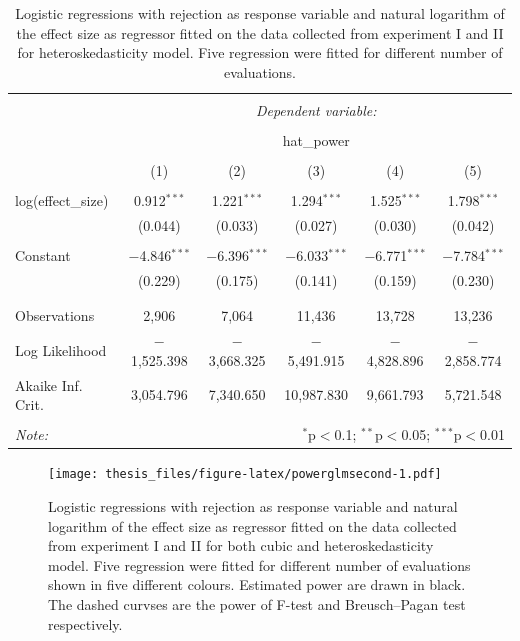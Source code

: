 \documentclass{monashthesis}
\theoremstyle{definition}
\theoremstyle{definition}
\theoremstyle{definition}
\theoremstyle{definition}
\theoremstyle{remark}
\begin{document}
\begin{table}[!htbp] \centering 
  \caption{Logistic regressions with rejection as response variable and natural logarithm of the effect size as regressor fitted on the data collected from experiment I and II for heteroskedasticity model. Five regression were fitted for different number of evaluations.} 
  \label{tab:powerglmhetersecond} 
\begin{tabular}{@{\extracolsep{5pt}}lccccc} 
\\[-1.8ex]\hline 
\hline \\[-1.8ex] 
 & \multicolumn{5}{c}{\textit{Dependent variable:}} \\ 
\cline{2-6} 
\\[-1.8ex] & \multicolumn{5}{c}{hat\_power} \\ 
\\[-1.8ex] & (1) & (2) & (3) & (4) & (5)\\ 
\hline \\[-1.8ex] 
 log(effect\_size) & 0.912$^{***}$ & 1.221$^{***}$ & 1.294$^{***}$ & 1.525$^{***}$ & 1.798$^{***}$ \\ 
  & (0.044) & (0.033) & (0.027) & (0.030) & (0.042) \\ 
  & & & & & \\ 
 Constant & $-$4.846$^{***}$ & $-$6.396$^{***}$ & $-$6.033$^{***}$ & $-$6.771$^{***}$ & $-$7.784$^{***}$ \\ 
  & (0.229) & (0.175) & (0.141) & (0.159) & (0.230) \\ 
  & & & & & \\ 
\hline \\[-1.8ex] 
Observations & 2,906 & 7,064 & 11,436 & 13,728 & 13,236 \\ 
Log Likelihood & $-$1,525.398 & $-$3,668.325 & $-$5,491.915 & $-$4,828.896 & $-$2,858.774 \\ 
Akaike Inf. Crit. & 3,054.796 & 7,340.650 & 10,987.830 & 9,661.793 & 5,721.548 \\ 
\hline 
\hline \\[-1.8ex] 
\textit{Note:}  & \multicolumn{5}{r}{$^{*}$p$<$0.1; $^{**}$p$<$0.05; $^{***}$p$<$0.01} \\ 
\end{tabular} 
\end{table}

\begin{figure}
\centering
\texttt{[image: thesis\_files/figure-latex/powerglmsecond-1.pdf]}
\caption{\label{fig:powerglmsecond}Logistic regressions with rejection as response variable and natural logarithm of the effect size as regressor fitted on the data collected from experiment I and II for both cubic and heteroskedasticity model. Five regression were fitted for different number of evaluations shown in five different colours. Estimated power are drawn in black. The dashed curvses are the power of F-test and Breusch--Pagan test respectively.}
\end{figure}
\end{document}
